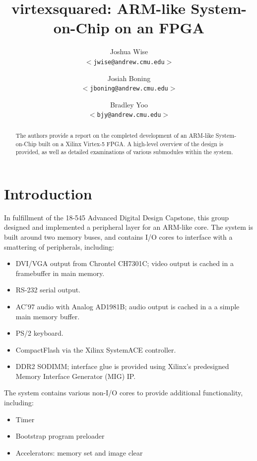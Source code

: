 \documentclass[10pt]{article}
\title{virtexsquared: ARM-like System-on-Chip on an FPGA}
\author{Joshua Wise\\
\texttt{$<$jwise@andrew.cmu.edu$>$} \and
Josiah Boning\\
\texttt{$<$jboning@andrew.cmu.edu$>$} \and
Bradley Yoo\\
\texttt{$<$bjy@andrew.cmu.edu$>$}}
\begin{document}
\maketitle

\begin{abstract}

The authors provide a report on the completed development of an ARM-like
System-on-Chip built on a Xilinx Virtex-5 FPGA.  A high-level overview of
the design is provided, as well as detailed examinations of various
submodules within the system.  

\end{abstract}

\vspace{0.1in} %

\section{Introduction}

In fulfillment of the 18-545 Advanced Digital Design Capstone, this group
designed and implemented a peripheral layer for an ARM-like core. 
The system is built around two memory buses, and contains I/O cores to
interface with a smattering of peripherals, including:

\begin{itemize}
\item{DVI/VGA output from Chrontel CH7301C; video output is cached in a
framebuffer in main memory.}
\item{RS-232 serial output.}
\item{AC'97 audio with Analog AD1981B; audio output is cached in a
a simple main memory buffer.}
\item{PS/2 keyboard.}
\item{CompactFlash via the Xilinx SystemACE controller.}
\item{DDR2 SODIMM; interface glue is provided using Xilinx's predesigned
Memory Interface Generator (MIG) IP.}
\end{itemize}

The system contains various non-I/O cores to provide additional functionality,
including:

\begin{itemize}
\item{Timer}
\item{Bootstrap program preloader}
\item{Accelerators: memory set and image clear}
\end{itemize}
\end{document}
